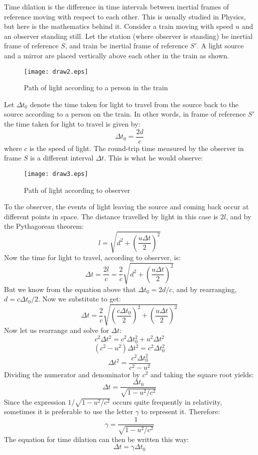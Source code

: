\documentclass[12pt]{article}
\begin{document}
Time dilation is the difference in time intervals between inertial frames of reference moving with respect to each other. This is usually studied in Physics, but here is the mathematics behind it.\linebreak
Consider a train moving with speed $u$ and an observer standing still. Let the station (where observer is standing) be inertial frame of reference $S$, and train be inertial frame of reference $S'$. A light source and a mirror are placed vertically above each other in the train as shown.
\begin{figure}
\begin{center}
\texttt{[image: draw2.eps]}
\caption{Path of light according to a person in the train}
\end{center}
\end{figure}
Let $\Delta t_0$ denote the time taken for light to travel from the source back to the source according to a person on the train. In other words, in frame of reference $S'$ the time taken for light to travel is given by:
$$\Delta t_0 = \frac{2d}{c}$$ where $c$ is the speed of light.
The round-trip time measured by the observer in frame $S$ is a different interval $\Delta t$. This is what he would observe:
\begin{figure}
\begin{center}
\texttt{[image: draw3.eps]}
\caption{Path of light according to observer}
\end{center}
\end{figure}
To the observer, the events of light leaving the source and coming back occur at different points in space. The distance travelled by light in this case is $2l$, and by the Pythagorean theorem:
$$l=\sqrt{d^2 + \left(\frac{u\Delta t}{2}\right)^2}$$
Now the time for light to travel, according to observer, is:
$$\Delta t=\frac{2l}{c}=\frac{2}{c}\sqrt{d^2 + \left(\frac{u\Delta t}{2}\right)^2}$$
But we know from the equation above that $\Delta t_0 = 2d/c$, and by rearranging, $d=c\Delta t_0/2$. Now we substitute to get:
$$\Delta t=\frac{2}{c}\sqrt{\left(\frac{c\Delta t_0}{2}\right)^2 + \left(\frac{u\Delta t}{2}\right)^2}$$
Now let us rearrange and solve for $\Delta t$:
$$c^2\Delta t^2 = c^2\Delta t_0^2 + u^2\Delta t^2$$
$$(c^2-u^2)\Delta t^2 = c^2\Delta t_0^2$$
$$\Delta t^2 = \frac{c^2\Delta t_0^2}{c^2-u^2}$$
Dividing the numerator and denominator by $c^2$ and taking the square root yields:
$$\Delta t = \frac{\Delta t_0}{\sqrt{1-u^2/c^2}}$$
Since the expression $1/\sqrt{1-u^2/c^2}$ occurs quite frequently in relativity, sometimes it is preferable to use the letter $\gamma$ to represent it. Therefore:
$$\gamma = \frac{1}{\sqrt{1-u^2/c^2}}$$
The equation for time dilation can then be written this way:
$$\Delta t = \gamma \Delta t_0$$
\end{document}
